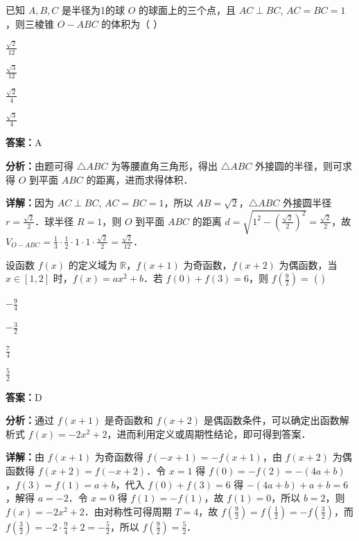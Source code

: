\begin{question}[points=5]
已知 $A, B, C$ 是半径为1的球 $O$ 的球面上的三个点，且 $AC \perp BC$, $AC = BC = 1$，则三棱锥 $O-ABC$ 的体积为（ ）
\begin{choices}
  \item $\frac{\sqrt{2}}{12}$
  \item $\frac{\sqrt{3}}{12}$
  \item $\frac{\sqrt{2}}{4}$
  \item $\frac{\sqrt{3}}{4}$
\end{choices}
\begin{solution}
\textbf{答案：}A

\textbf{分析：}由题可得 $\triangle ABC$ 为等腰直角三角形，得出 $\triangle ABC$ 外接圆的半径，则可求得 $O$ 到平面 $ABC$ 的距离，进而求得体积．

\textbf{详解：}因为 $AC \perp BC$, $AC = BC = 1$，所以 $AB = \sqrt{2}$，$\triangle ABC$ 外接圆半径 $r = \frac{\sqrt{2}}{2}$．球半径 $R=1$，则 $O$ 到平面 $ABC$ 的距离 $d = \sqrt{1^2 - \left(\frac{\sqrt{2}}{2}\right)^2} = \frac{\sqrt{2}}{2}$，故 $V_{O-ABC} = \frac{1}{3} \cdot \frac{1}{2} \cdot 1 \cdot 1 \cdot \frac{\sqrt{2}}{2} = \frac{\sqrt{2}}{12}$．
\end{solution}
\end{question}

\begin{question}[points=5]
设函数 $f(x)$ 的定义域为 $\mathbb{R}$，$f(x+1)$ 为奇函数，$f(x+2)$ 为偶函数，当 $x \in [1,2]$ 时，$f(x) = ax^2 + b$．若 $f(0) + f(3) = 6$，则 $f\left(\frac{9}{2}\right) =$ ( )
\begin{choices}
  \item $-\frac{9}{4}$
  \item $-\frac{3}{2}$
  \item $\frac{7}{4}$
  \item $\frac{5}{2}$
\end{choices}
\begin{solution}
\textbf{答案：}D

\textbf{分析：}通过 $f(x+1)$ 是奇函数和 $f(x+2)$ 是偶函数条件，可以确定出函数解析式 $f(x) = -2x^2 + 2$，进而利用定义或周期性结论，即可得到答案．

\textbf{详解：}由 $f(x+1)$ 为奇函数得 $f(-x+1) = -f(x+1)$，由 $f(x+2)$ 为偶函数得 $f(x+2) = f(-x+2)$．令 $x=1$ 得 $f(0) = -f(2) = -(4a+b)$，$f(3) = f(1) = a+b$，代入 $f(0)+f(3)=6$ 得 $-(4a+b)+a+b=6$，解得 $a=-2$．令 $x=0$ 得 $f(1)=-f(1)$，故 $f(1)=0$，所以 $b=2$，则 $f(x) = -2x^2+2$．由对称性可得周期 $T=4$，故 $f\left(\frac{9}{2}\right) = f\left(\frac{1}{2}\right) = -f\left(\frac{3}{2}\right)$，而 $f\left(\frac{3}{2}\right) = -2\cdot\frac{9}{4}+2 = -\frac{5}{2}$，所以 $f\left(\frac{9}{2}\right) = \frac{5}{2}$．
\end{solution}
\end{question}

